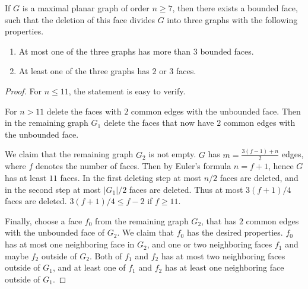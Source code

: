 \begin{lemma} \label{lem:del_face}
  If $G$ is a maximal planar graph of order $n \ge 7$, then there exists a bounded
  face, such that the deletion of this face divides $G$ into three graphs with the
  following properties.
  \begin{enumerate}
    \item At most one of the three graphs has more than $3$ bounded faces.
    \item At least one of the three graphs has $2$ or $3$ faces.
  \end{enumerate}
\end{lemma}
\begin{proof}
  For $n \le 11$, the statement is easy to verify.

  For $n > 11$ delete the faces with $2$ common edges with the unbounded face. Then in the remaining
  graph $G_1$ delete the faces that now have $2$ common edges with the unbounded face.

  We claim that the remaining graph $G_2$ is not empty. $G$
  has $m = \frac{3(f - 1) + n}{2}$ edges, where $f$ denotes the number of faces.
  Then by Euler's formula $n = f + 1$, hence $G$ has at least $11$ faces. In the
  first deleting step at most $n/2$ faces are deleted, and in the second step at most
  $|G_1|/2$ faces are deleted. Thus at most $3(f + 1) / 4$ faces are deleted.
  $3(f + 1) / 4 \le f - 2$ if $f \ge 11$.

  Finally, choose a face $f_0$ from the remaining graph $G_2$, that has $2$ common edges with
  the unbounded face of $G_2$. We claim that $f_0$ has the desired properties. $f_0$ has at most
  one neighboring face in $G_2$, and one or two neighboring faces $f_1$ and maybe $f_2$ outside of $G_2$.
  Both of $f_1$ and $f_2$ has at most two neighboring faces outside of $G_1$, and
  at least one of $f_1$ and $f_2$ has at least one neighboring face outside of $G_1$.
\end{proof}

